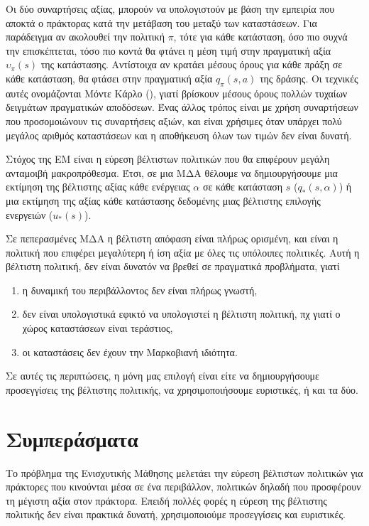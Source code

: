 Οι δύο συναρτήσεις αξίας, μπορούν να υπολογιστούν με βάση την εμπειρία που αποκτά ο πράκτορας κατά την μετάβαση του μεταξύ των καταστάσεων.
Για παράδειγμα αν ακολουθεί την πολιτική $π$, τότε για κάθε κατάσταση, όσο πιο συχνά την επισκέπτεται, τόσο πιο κοντά θα φτάνει η μέση τιμή
στην πραγματική αξία $υ_π(s)$ της κατάστασης. Αντίστοιχα αν κρατάει μέσους όρους για κάθε πράξη σε κάθε κατάσταση, θα φτάσει στην πραγματική
αξία $q_π(s,a)$ της δράσης. Οι τεχνικές αυτές ονομάζονται Μόντε Κάρλο (), γιατί βρίσκουν μέσους όρους πολλών τυχαίων δειγμάτων πραγματικών αποδόσεων.
Ένας άλλος τρόπος είναι με χρήση συναρτήσεων που προσομοιώνουν τις συναρτήσεις αξιών, και είναι χρήσιμες όταν υπάρχει πολύ μεγάλος αριθμός καταστάσεων
και η αποθήκευση όλων των τιμών δεν είναι δυνατή.

Στόχος της ΕΜ είναι η εύρεση βέλτιστων πολιτικών που θα επιφέρουν μεγάλη ανταμοιβή μακροπρόθεσμα. Έτσι, σε μια ΜΔΑ θέλουμε να δημιουργήσουμε
μια εκτίμηση της βέλτιστης αξίας κάθε ενέργειας $α$ σε κάθε κατάσταση $s$ ($q_*(s,α)$) ή μια εκτίμηση της αξίας κάθε κατάστασης δεδομένης
μιας βέλτιστης επιλογής ενεργειών ($u_*(s)$).

Σε πεπερασμένες ΜΔΑ η βέλτιστη απόφαση είναι πλήρως ορισμένη, και είναι η πολιτική που επιφέρει μεγαλύτερη ή ίση αξία με όλες τις υπόλοιπες πολιτικές.
Αυτή η βέλτιστη πολιτική, δεν είναι δυνατόν να βρεθεί σε πραγματικά προβλήματα, γιατί
\begin{enumerate}
    \item η δυναμική του περιβάλλοντος δεν είναι πλήρως γνωστή,
    \item δεν είναι υπολογιστικά εφικτό να υπολογιστεί η βέλτιστη πολιτική, πχ γιατί ο χώρος καταστάσεων είναι τεράστιος,
    \item οι καταστάσεις δεν έχουν την Μαρκοβιανή ιδιότητα.
\end{enumerate}

Σε αυτές τις περιπτώσεις, η μόνη μας επιλογή είναι είτε να δημιουργήσουμε προσεγγίσεις της βέλτιστης πολιτικής, να χρησιμοποιήσουμε ευριστικές, ή και τα δύο.

\section{Συμπεράσματα}

Το πρόβλημα της Ενισχυτικής Μάθησης μελετάει την εύρεση βέλτιστων πολιτικών για πράκτορες που κινούνται μέσα σε ένα περιβάλλον,
πολιτικών δηλαδή που προσφέρουν τη μέγιστη αξία στον πράκτορα. Επειδή πολλές φορές η εύρεση της βέλτιστης πολιτικής δεν είναι πρακτικά δυνατή,
χρησιμοποιούμε προσεγγίσεις και ευριστικές.

